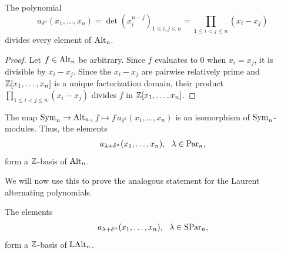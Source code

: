 \documentclass[11pt]{amsart}
\begin{document}
\begin{lem}\label{lem:adelta}
The polynomial
\begin{equation}
    a_{\delta^n}(x_1,\ldots,x_n)=\det\left(x_i^{n-j}\right)_{1\leq i,j\le n}=\prod_{1\leq i<j\leq n}(x_i-x_j) 
\end{equation} 
divides every element of $\mathrm{Alt}_n$.
\end{lem}

\begin{proof}
    Let $f \in \mathrm{Alt}_n$ be arbitrary. Since $f$ evaluates to $0$ when $x_i=x_j$, it is divisible by $x_i-x_j$. Since the $x_i-x_j$ are pairwise relatively prime and $\mathbb{Z}[x_1, \dots, x_n]$ is a unique factorization domain, their product $\prod_{1\le i<j\le n}(x_i-x_j)$ divides $f$ in $\mathbb{Z}[x_1, \dots, x_n]$. 
\end{proof}

\begin{prop}{\cite[Ch.~I, \S3, p.~40]{Mac15}}\label{prop:alt-basis}
     The map $\mathrm{Sym}_n \to \mathrm{Alt}_n$, $f \mapsto f\,a_{\delta^n}(x_1,\ldots,x_n)$ is an isomorphism of $\mathrm{Sym}_n$-modules. Thus, the elements 
    \begin{align} 
        a_{\lambda + \delta^n}(x_1, \ldots, x_n) , ~~ \lambda \in \mathrm{Par}_n,
    \end{align}
    form a $\mathbb{Z}$-basis of $\mathrm{Alt}_n$.
\end{prop}

We will now use this to prove the analogous statement for the Laurent alternating polynomials.

\begin{prop} \label{prop:basis-LAlt}
    The elements 
    \begin{align} \label{eq:shifted-alt}
        a_{\lambda + \delta^n}(x_1, \ldots, x_n) , ~~ \lambda \in \mathrm{SPar}_n,
    \end{align}
    form a $\mathbb{Z}$-basis of $\mathrm{LAlt}_n$.
\end{prop}
\end{document}
